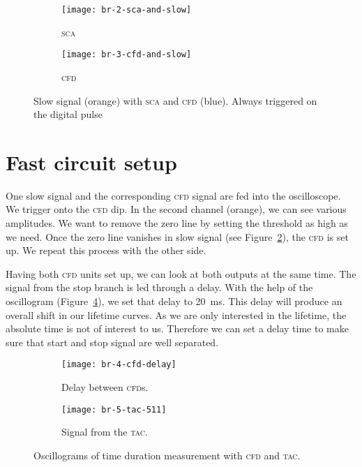 \documentclass[11pt, english, fleqn, DIV=15, headinclude, BCOR=2cm]{scrreprt}
\begin{document}
\begin{figure}
    \centering
    \begin{subfigure}[c]{0.48\linewidth}
        \centering
        \texttt{[image: br-2-sca-and-slow]}
        \caption{%
            \textsc{sca}
        }
        \label{fig:2-sca-and-slow}
    \end{subfigure}
    \hfill
    \begin{subfigure}[c]{0.48\linewidth}
        \centering
        \texttt{[image: br-3-cfd-and-slow]}
        \caption{%
            \textsc{cfd}
        }
        \label{fig:3-cfd-and-slow}
    \end{subfigure}
    \caption{%
        Slow signal (orange) with \textsc{sca} and \textsc{cfd} (blue). Always
        triggered on the digital pulse
    }
    \label{fig:}
\end{figure}

\section{Fast circuit setup}

One slow signal and the corresponding \textsc{cfd} signal are fed into the
oscilloscope. We trigger onto the \textsc{cfd} dip. In the second channel
(orange), we can see various amplitudes. We want to remove the zero line by
setting the threshold as high as we need. Once the zero line vanishes in slow
signal (see Figure~\ref{fig:3-cfd-and-slow}), the \textsc{cfd} is set up. We
repeat this process with the other side.

Having both \textsc{cfd} units set up, we can look at both outputs at the same
time. The signal from the stop branch is led through a delay. With the help of
the oscillogram (Figure~\ref{fig:4-cfd-delay}), we set that delay to
\SI{20}{\milli\second}. This delay will produce an overall shift in our
lifetime curves. As we are only interested in the lifetime, the absolute time
is not of interest to us. Therefore we can set a delay time to make sure that
start and stop signal are well separated.

\begin{figure}
    \centering
    \begin{subfigure}[c]{0.48\linewidth}
        \centering
        \texttt{[image: br-4-cfd-delay]}
        \caption{%
            Delay between \textsc{cfd}s.
        }
        \label{fig:4-cfd-delay}
    \end{subfigure}
    \hfill
    \begin{subfigure}[c]{0.48\linewidth}
        \centering
        \texttt{[image: br-5-tac-511]}
        \caption{%
            Signal from the \textsc{tac}.
        }
        \label{fig:5-tac-511}
    \end{subfigure}
    \caption{%
        Oscillograms of time duration measurement with \textsc{cfd} and
        \textsc{tac}.
    }
    \label{fig:}
\end{figure}
\end{document}
